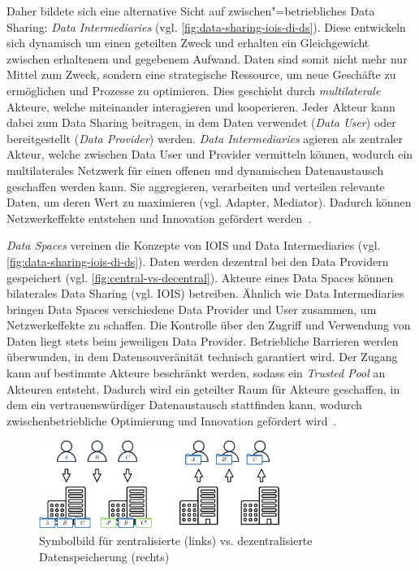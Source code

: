 Daher bildete sich eine alternative Sicht auf zwischen"=betriebliches Data Sharing: \emph{Data Intermediaries} (vgl. \autoref{fig:data-sharing-iois-di-ds}).
Diese entwickeln sich dynamisch um einen geteilten Zweck und erhalten ein Gleichgewicht zwischen erhaltenem und gegebenem Aufwand.
Daten sind somit nicht mehr nur Mittel zum Zweck, sondern eine strategische Ressource, um neue Geschäfte zu ermöglichen und Prozesse zu optimieren.
Dies geschieht durch \emph{multilaterale} Akteure, welche miteinander interagieren und kooperieren.
Jeder Akteur kann dabei zum Data Sharing beitragen, in dem Daten verwendet (\emph{Data User}) oder bereitgestellt (\emph{Data Provider}) werden.
\emph{Data Intermediaries} agieren als zentraler Akteur, welche zwischen Data User und Provider vermitteln können, wodurch ein  multilaterales Netzwerk für einen offenen und dynamischen Datenaustausch geschaffen werden kann.
Sie aggregieren, verarbeiten und verteilen relevante Daten, um deren Wert zu maximieren (vgl. Adapter, Mediator).
Dadurch können Netzwerkeffekte entstehen und Innovation gefördert werden~\cite{mollerIndustrialDataEcosystems2024}.

\emph{Data Spaces} vereinen die Konzepte von IOIS und Data Intermediaries (vgl. \autoref{fig:data-sharing-iois-di-ds}).
Daten werden dezentral bei den Data Providern gespeichert (vgl. \autoref{fig:central-vs-decentral}).
Akteure eines Data Spaces können bilaterales Data Sharing (vgl. IOIS) betreiben.
Ähnlich wie Data Intermediaries bringen Data Spaces verschiedene Data Provider und User zusammen, um Netzwerkeffekte zu schaffen.
Die Kontrolle über den Zugriff und Verwendung von Daten liegt stets beim jeweiligen Data Provider.
Betriebliche Barrieren werden überwunden, in dem Datensouveränität technisch garantiert wird.
Der Zugang kann auf bestimmte Akteure beschränkt werden, sodass ein \emph{Trusted Pool} an Akteuren entsteht.
Dadurch wird ein geteilter Raum für Akteure geschaffen, in dem ein vertrauenswürdiger Datenaustausch stattfinden kann, wodurch zwischenbetriebliche Optimierung und Innovation gefördert wird~\cite{mollerIndustrialDataEcosystems2024}.

\begin{figure}[b]
    \includegraphics[width=0.7\textwidth]{./assets/central_vs_decentral.drawio.pdf}
    \caption{Symbolbild für zentralisierte (links) vs. dezentralisierte Datenspeicherung (rechts)}
    \label{fig:central-vs-decentral}
\end{figure}

